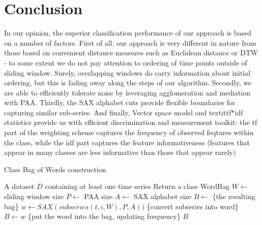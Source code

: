 \documentclass{llncs}
\begin{document}
\section{Conclusion}
In our opinion, the superior classification performance of our approach is based on 
a number of factors. 
First of all, our approach is very different in nature from those 
based on convenient distance measures such as Euclidean distance or DTW - to some 
extent we do not pay attention to ordering of time points outside of sliding window. 
Surely, overlapping windows do carry information about initial ordering, but this 
is fading away along the steps of our algorithm.
Secondly, we are able to efficiently tolerate noise by leveraging agglomeration 
and mediation with PAA. 
Thirdly, the SAX alphabet cuts provide flexible boundaries for capturing similar 
sub-series. 
And finally, Vector space model and textit{tf$\ast$idf} statistics provide us 
with efficient discrimination and measurement toolkit: the tf part of the weighting scheme
captures the frequency of observed feqtures within the class, while the idf part 
captures the feature informativeness (features that appear in many classes 
are less informative than those that appear rarely)

\begin{algorithm}
\caption{Class Bag of Words construction}
\label{alg1}
\begin{algorithmic}[1]
\REQUIRE A dataset $D$ containing at least one time series
\ENSURE Return a class WordBag
\STATE $W \leftarrow$ sliding window size
\STATE $P \leftarrow$ PAA size
\STATE $A \leftarrow$ SAX alphabet size
\STATE $B \leftarrow$ \{the resulting bag\}
 \STATE $w \leftarrow SAX(subseries(t,i,W), P, A))$ \{convert subseries into word\}
 \STATE $B \leftarrow w$ \{put the word into the bag, updating frequency\}
 \ENDFOR
\ENDFOR
\RETURN $B$
\end{algorithmic}
\end{algorithm}
\end{document}

